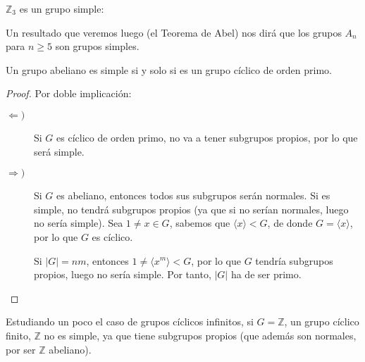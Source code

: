 \begin{ejemplo}
    $\mathbb{Z}_3$ es un grupo simple:
    \begin{figure}[H]
        \centering
    \end{figure}
    Un resultado que veremos luego (el Teorema de Abel) nos dirá que los grupos $A_n$ para $n\geq 5$ son grupos simples.
\end{ejemplo}

\begin{prop}
    Un grupo abeliano es simple si y solo si es un grupo cíclico de orden primo.
    \begin{proof}
        Por doble implicación:
        \begin{description}
            \item [$\Longleftarrow)$] Si $G$ es cíclico de orden primo, no va a tener subgrupos propios, por lo que será simple.
            \item [$\Longrightarrow)$] Si $G$ es abeliano, entonces todos sus subgrupos serán normales. Si es simple, no tendrá subgrupos propios (ya que si no serían normales, luego no sería simple). Sea $1\neq x\in G$, sabemos que $\langle x \rangle < G$, de donde $G = \langle x \rangle $, por lo que $G$ es cíclico.

                Si $|G| = nm$, entonces $1\neq \langle x^m \rangle < G$, por lo que $G$ tendría subgrupos propios, luego no sería simple. Por tanto, $|G|$ ha de ser primo.
        \end{description}
    \end{proof}
\end{prop}

\begin{ejemplo}
    Estudiando un poco el caso de grupos cíclicos infinitos, si $G=\mathbb{Z}$, un grupo cíclico finito, $\mathbb{Z}$ no es simple, ya que tiene subgrupos propios (que además son normales, por ser $\mathbb{Z}$ abeliano).
\end{ejemplo}

